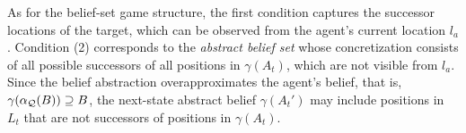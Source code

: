 As for the belief-set game structure, the first condition captures the successor locations of the target, which can be observed from the agent's current location $l_a$. Condition (2) corresponds to the \emph{abstract belief set} whose concretization  consists of all possible successors of all positions in $\gamma(A_t)$, which are  not visible from $l_a$. Since the belief abstraction overapproximates the agent's belief, that is, $\gamma(\alpha_{\mathcal{Q}}(B)) \supseteq B$, the next-state abstract belief $\gamma(A_t')$ may include positions in $L_t$ that are not successors of positions in $\gamma(A_t)$.

%
%
%

